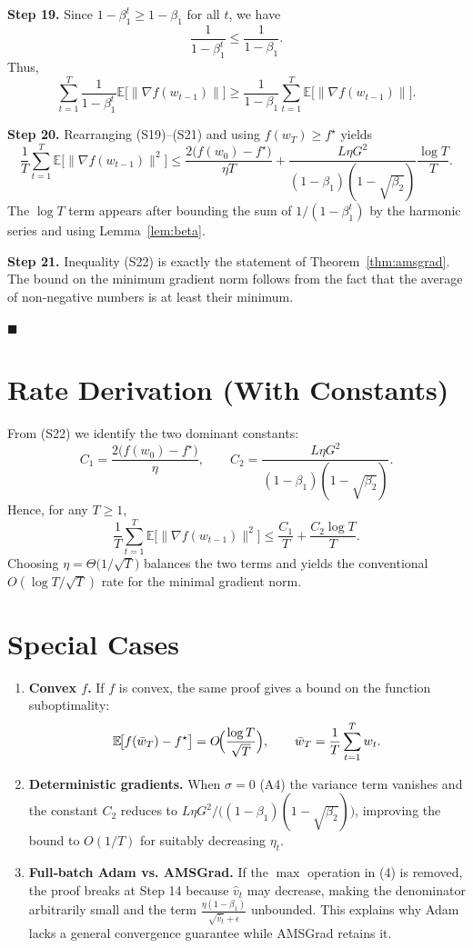 \documentclass[11pt]{article}
\newcommand{\E}{\mathbb{E}}
\begin{document}
\textbf{Step 19.} Since $1-\beta_{1}^{t}\ge 1-\beta_{1}$ for all $t$, we have
\[
\frac{1}{1-\beta_{1}^{t}}\le \frac{1}{1-\beta_{1}}. \tag{S20}
\]
Thus,
\[
\sum_{t=1}^{T}\frac{1}{1-\beta_{1}^{t}}
\E\!\bigl[\|\nabla f(w_{t-1})\|\bigr]
\ge
\frac{1}{1-\beta_{1}}\sum_{t=1}^{T}
\E\!\bigl[\|\nabla f(w_{t-1})\|\bigr]. \tag{S21}
\]

\textbf{Step 20.} Rearranging (S19)–(S21) and using $f(w_{T})\ge f^{\star}$ yields
\[
\frac{1}{T}\sum_{t=1}^{T}
\E\!\bigl[\|\nabla f(w_{t-1})\|^{2}\bigr]
\le
\frac{2\bigl(f(w_{0})-f^{\star}\bigr)}{\eta T}
+\frac{L\eta G^{2}}{(1-\beta_{1})(1-\sqrt{\beta_{2}})}\frac{\log T}{T}. \tag{S22}
\]
The $\log T$ term appears after bounding the sum of $1/(1-\beta_{1}^{t})$ by
the harmonic series and using Lemma~\ref{lem:beta}.

\textbf{Step 21.} Inequality (S22) is exactly the statement of
Theorem~\ref{thm:amsgrad}.  The bound on the minimum gradient norm follows from
the fact that the average of non‑negative numbers is at least their minimum.

\hfill $\blacksquare$

\section*{Rate Derivation (With Constants)}
From (S22) we identify the two dominant constants:
\[
C_{1}= \frac{2\bigl(f(w_{0})-f^{\star}\bigr)}{\eta},
\qquad
C_{2}= \frac{L\eta G^{2}}{(1-\beta_{1})(1-\sqrt{\beta_{2}})}.
\]
Hence, for any $T\ge1$,
\[
\frac{1}{T}\sum_{t=1}^{T}\E\!\bigl[\|\nabla f(w_{t-1})\|^{2}\bigr]
\le \frac{C_{1}}{T}+\frac{C_{2}\log T}{T}.
\]
Choosing $\eta= \Theta\!\bigl(1/\sqrt{T}\bigr)$ balances the two terms and yields
the conventional $O(\log T/\sqrt{T})$ rate for the minimal gradient norm.

\section*{Special Cases}
\begin{enumerate}[label=\alph*)]
\item \textbf{Convex $f$.} If $f$ is convex, the same proof gives a bound on the
function suboptimality:
\[
\E\!\bigl[f(\bar w_{T})-f^{\star}\bigr]
=O\!\Bigl(\frac{\log T}{\sqrt{T}}\Bigr),
\qquad
\bar w_{T}=\frac{1}{T}\sum_{t=1}^{T}w_{t}.
\]

\item \textbf{Deterministic gradients.} When $\sigma=0$ (A4) the variance term
vanishes and the constant $C_{2}$ reduces to $L\eta G^{2}/\bigl((1-\beta_{1})(1-\sqrt{\beta_{2}})\bigr)$,
improving the bound to $O(1/T)$ for suitably decreasing $\eta_{t}$.

\item \textbf{Full‑batch Adam vs. AMSGrad.} If the $\max$ operation in (4) is
removed, the proof breaks at Step 14 because $\hat v_{t}$ may decrease,
making the denominator arbitrarily small and the term
$\frac{\eta(1-\beta_{1})}{\sqrt{\hat v_{t}}+\epsilon}$ unbounded.  This explains why
Adam lacks a general convergence guarantee while AMSGrad retains it.
\end{enumerate}
\end{document}
